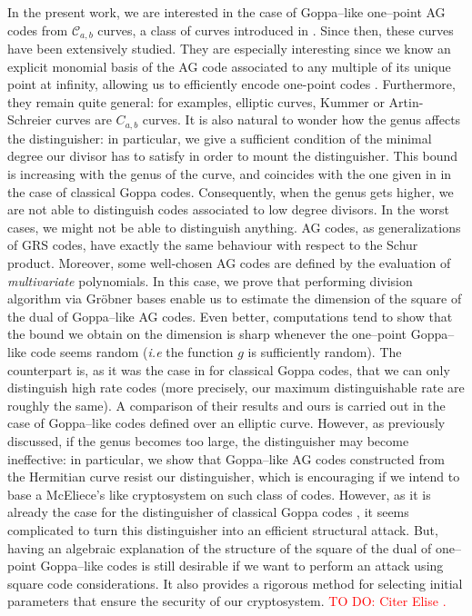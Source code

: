 \documentclass[a4paper]{article}
\theoremstyle{definition}
\theoremstyle{remark}
\newcommand{\calC}{\mathcal{C}}
\newcommand\TODO[1]{\textcolor{red}{TO DO: #1}}
\begin{document}
\medskip

In the present work, we are interested in the case of Goppa--like one--point AG codes from $\calC_{a,b}$ curves, a class of curves introduced in \cite{Miu93}. Since then, these curves have been extensively studied. They are especially interesting since we know an explicit monomial basis of the AG code associated to any multiple of its unique point at infinity, allowing us to efficiently encode one-point codes \cite{BRS21}. Furthermore, they remain quite general: for examples, elliptic curves, Kummer or Artin-Schreier curves are $C_{a,b}$ curves. It is also natural to wonder how the genus affects the distinguisher: in particular, we give a sufficient condition of the minimal degree our divisor has to satisfy in order to mount the distinguisher. This bound is increasing with the genus of the curve, and coincides with the one given in \cite{MT21} in the case of classical Goppa codes. Consequently, when the genus gets higher, we are not able to distinguish codes associated to low degree divisors. In the worst cases, we might not be able to distinguish anything.
AG codes, as generalizations of GRS codes, have exactly the same behaviour with respect to the Schur product. Moreover, some well-chosen AG codes are defined by the evaluation of \textit{multivariate} polynomials. In this case, we prove that performing division algorithm via Gr\"obner bases enable us to estimate the dimension of the square of the dual of Goppa--like AG codes. Even better, computations tend to show that the bound we obtain on the dimension is sharp whenever the one--point Goppa--like code seems random (\emph{i.e} the function $g$ is sufficiently random). The counterpart is, as it was the case in \cite{MT21} for classical Goppa codes, that we can only distinguish high rate codes (more precisely, our maximum distinguishable rate are roughly the same). A comparison of their results and ours is carried out in the case of Goppa--like codes defined over an elliptic curve. However, as previously discussed, if the genus becomes too large, the distinguisher may become ineffective: in particular, we show that Goppa--like AG codes constructed from the Hermitian curve resist our distinguisher, which is encouraging if we intend to base a McEliece's like cryptosystem on such class of codes.
However, as it is already the case for the distinguisher of classical Goppa codes \cite{MT21}, it seems complicated to turn this distinguisher into an efficient structural attack. But, having an algebraic explanation of the structure of the square of the dual of one--point Goppa--like codes is still desirable if we want to perform an attack using square code considerations. It also provides a rigorous method for selecting initial parameters that ensure the security of our cryptosystem.
\TODO{ Citer Elise \cite{B18}.}
\end{document}

